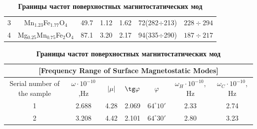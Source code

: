 \begin{table}
\begin{minipage}{.75\textwidth}
\begin{tabular}{c|c|c|c|c|c|c}
  3 &  Mn$_{1.23}$Fe$_{1.77}$O$_4$       & 49{.}7 & 1{.}12 & 1{.}62 & 72(282$\div$213) & $228\div294$ \\

  4 &  Mg$_{0.25}$Mn$_{0.75}$Fe$_2$O$_4$ & 87{.}1 & 3{.}20 & 2{.}17 & 94(335$\div$290) & $187\div217$ \\

\hline

\end{tabular} \label{vel:tab1}





\end{minipage}



\bigskip



\bigskip





\begin{minipage}{.75\textwidth}

\centering

\small

\caption{\bf Границы частот поверхностных магнитостатических мод } \vspace{-3mm} 

\begin{tabular}{c|c|c|c|c|c|c}

\multicolumn{7}{c}{\bf [Frequency Range of Surface Magnetostatic Modes]} \\

\hline

\footnotesize Serial number of the sample  &  

\footnotesize $\omega \cdot10^{-10}$,Hz    &

\footnotesize $|\mu|$  &

\footnotesize $\tg\varphi$ &

\footnotesize $\varphi$ & 

\footnotesize $\omega_H\cdot10^{-10}$, Hz    &

\footnotesize $\omega_C\cdot10^{-10}$, Hz    \\

 \hline

 \rule{0mm}{12pt}%

  1 &  2{.}688 & 4{.}28 & 2{.}069 & $64^\circ10'$ & 2{.}33 & 2{.}74  \\

  2 &  3{.}208 & 4{.}42 & 2{.}101 & $64^\circ30'$ & 2{.}80 & 3{.}23  \\


\end{tabular}
\end{minipage}
\end{table}
